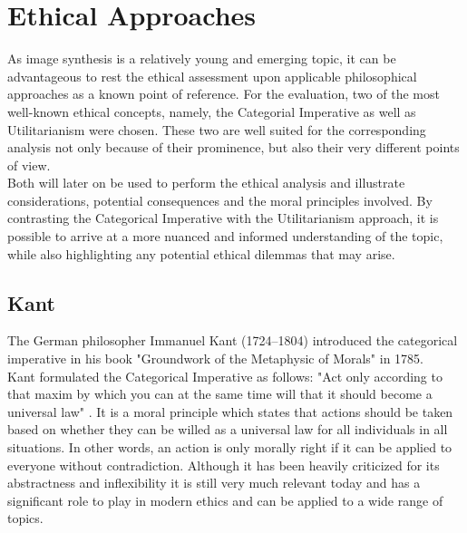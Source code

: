 \documentclass[10pt,twocolumn,twoside]{osajnl}
\begin{document}
\section{Ethical Approaches}
As image synthesis is a relatively young and emerging topic, it can be advantageous to rest the ethical assessment upon applicable philosophical approaches as a known point of reference.
For the evaluation, two of the most well-known ethical concepts, namely, the Categorial Imperative as well as Utilitarianism were chosen. These two are well suited for the corresponding analysis not only because of their prominence, but also their 
very different points of view.\\
Both will later on be used to perform the ethical analysis and illustrate considerations, potential consequences and the moral principles involved.
By contrasting the Categorical Imperative with the Utilitarianism approach, it is possible to arrive at a more nuanced and informed understanding of the topic, while also highlighting any potential ethical dilemmas that may arise.

\subsection{Kant}
The German philosopher Immanuel Kant (1724--1804) introduced the categorical imperative in his book "Groundwork of the Metaphysic of Morals" in 1785. \\
Kant formulated the Categorical Imperative as follows: "Act only according to that maxim by which you can at the same time will that it should become a universal law" \cite[translated from]{Kant:1990}. 
It is a moral principle which states that actions should be taken based on whether they can be willed as a universal law for all individuals in all situations. 
In other words, an action is only morally right if it can be applied to everyone without contradiction.
Although it has been heavily criticized for its abstractness and inflexibility it is still very much relevant today and has a significant role to play in modern ethics and can be applied to a wide range of topics. %
\end{document}
